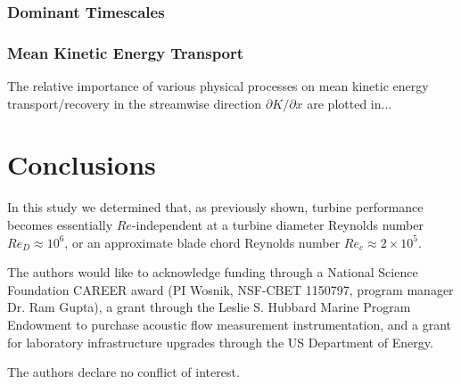 \documentclass[energies,article,accept,moreauthors,pdftex,12pt,a4paper]{mdpi}
\def \p{\partial}
\begin{document}


\subsubsection{Dominant Timescales}


\subsubsection{Mean Kinetic Energy Transport}

The relative importance of various physical processes on mean kinetic energy
transport/recovery in the streamwise direction $\p K / \p x$ are plotted in...



\section{Conclusions}

In this study we determined that, as previously shown, turbine performance
becomes essentially $Re$-independent at a turbine diameter Reynolds number $Re_D
\approx 10^6$, or an approximate blade chord Reynolds number $Re_c \approx 2
\times 10^5$.



The authors would like to acknowledge funding through a National Science
Foundation CAREER award (PI Wosnik, NSF-CBET 1150797, program manager Dr. Ram
Gupta), a grant through the Leslie S. Hubbard Marine Program Endowment to
purchase acoustic flow measurement instrumentation, and a grant for laboratory
infrastructure upgrades through the US Department of Energy.


The authors declare no conflict of interest.




\end{document}
